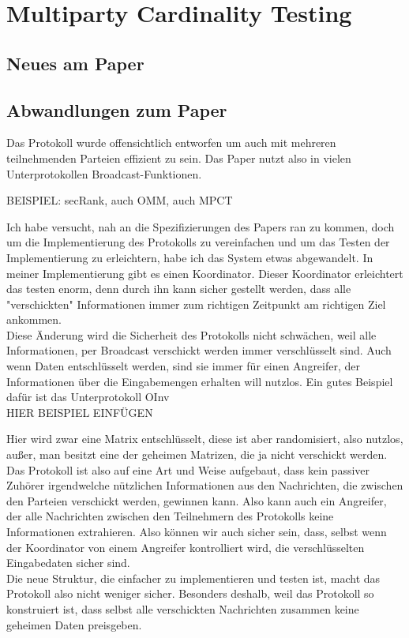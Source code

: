 \documentclass[a4paper,10pt]{scrartcl}
\begin{document}
\section{Multiparty Cardinality Testing}

\subsection{Neues am Paper}
\subsection{Abwandlungen zum Paper}
Das Protokoll wurde offensichtlich entworfen um auch mit mehreren teilnehmenden Parteien effizient zu sein.
Das Paper \cite{Doettling2021} nutzt also in vielen Unterprotokollen Broadcast-Funktionen.

BEISPIEL: secRank, auch OMM, auch MPCT

Ich habe versucht, nah an die Spezifizierungen des Papers ran zu kommen, doch 
um die Implementierung des Protokolls zu vereinfachen und um das Testen der Implementierung zu erleichtern, habe ich das System etwas abgewandelt. In meiner Implementierung gibt es einen Koordinator. Dieser Koordinator erleichtert das testen enorm, denn durch ihn kann sicher gestellt werden, dass alle "verschickten" Informationen immer zum richtigen Zeitpunkt am richtigen Ziel ankommen.\\
Diese Änderung wird die Sicherheit des Protokolls nicht schwächen, weil alle Informationen, per Broadcast verschickt werden immer verschlüsselt sind.
Auch wenn Daten entschlüsselt werden, sind sie immer für einen Angreifer, der Informationen über die Eingabemengen erhalten will nutzlos. Ein gutes Beispiel dafür ist das Unterprotokoll OInv \\
HIER BEISPIEL EINFÜGEN

Hier wird zwar eine Matrix entschlüsselt, diese ist aber randomisiert, also nutzlos, außer, man besitzt eine der geheimen Matrizen, die ja nicht verschickt werden.\\
Das Protokoll ist also auf eine Art und Weise aufgebaut, dass kein passiver Zuhörer irgendwelche nützlichen Informationen aus den Nachrichten, die zwischen den Parteien verschickt werden, gewinnen kann. Also kann auch ein Angreifer, der alle Nachrichten zwischen den Teilnehmern des Protokolls keine Informationen extrahieren. Also können wir auch sicher sein, dass, selbst wenn der Koordinator von einem Angreifer kontrolliert wird, die verschlüsselten Eingabedaten sicher sind.\\
Die neue Struktur, die einfacher zu implementieren und testen ist, macht das Protokoll also nicht weniger sicher. Besonders deshalb, weil das Protokoll so konstruiert ist, dass selbst alle verschickten Nachrichten zusammen keine geheimen Daten preisgeben.\\
\end{document}
